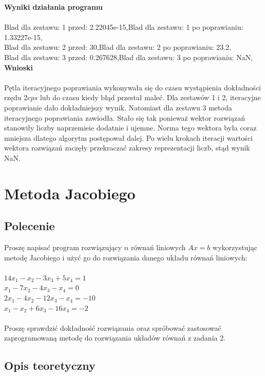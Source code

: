 \documentclass[a4paper, 11pt]{article}
\begin{document}
\vspace{1cm}
\textbf{Wyniki działania programu}\\
\\
Blad dla zestawu: 1 przed: 2.22045e-15,Blad dla zestawu: 1 po poprawianiu: 1.33227e-15,\\
Blad dla zestawu: 2 przed: 30,Blad dla zestawu: 2 po poprawianiu: 23.2,\\
Blad dla zestawu: 3 przed: 0.267628,Blad dla zestawu: 3 po poprawianiu: NaN,\\

\vspace{2cm}
\textbf{Wnioski}\\
\\
Pętla iteracyjnego poprawiania wykonywała się do czasu wystąpienia dokładności rzędu $2eps$ lub do czasu kiedy błąd przestał maleć. Dla zestawów 1 i 2, iteracyjne poprawianie dało dokładniejszy wynik. Natomiast dla zestawu 3 metoda iteracyjnego poprawiania zawiodła. Stało się tak ponieważ wektor rozwiązań stanowiły liczby naprzemieie dodatnie i ujemne. Norma tego wektora była coraz mniejsza dlatego algorytm postępował dalej. Po wielu krokach iteracji wartości wektora rozwiązań zaczęły przekraczać zakresy reprezentacji liczb, stąd wynik NaN. 

\section{Metoda Jacobiego}
\subsection{Polecenie}
\indent

Proszę napisać program rozwiązujący $n$ równań liniowych $Ax=b$ wykorzystując metodę Jacobiego i użyć go do rozwiązania danego układu równań liniowych:\\
\\
$14x_{1}-x_{2} -3x_{3}+5x_{4} = 1$\\
$x_{1}-7x_{2} -4x_{3}-x_{4} = 0$\\
$2x_{1}-4x_{2} -12x_{3}-x_{4} =-10$\\
$x_{1}-x_{2}+6x_{3}-16x_{4} = -2$\\
\\
Proszę sprawdzić dokładność rozwiązania oraz spróbować zastosować zaprogramowaną metodę do rozwiązania układów równań z zadania 2. 

\subsection{Opis teoretyczny}
\indent
\end{document}
